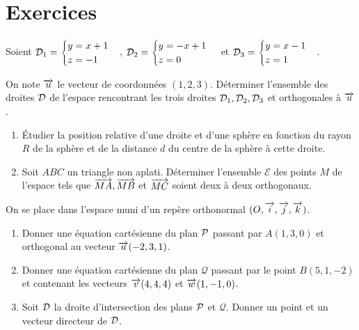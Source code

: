 \section{Exercices}
\begin{exercice}
  Soient \(\Dr_1 = 
  \begin{cases} 
    y = x + 1 \\
    z = -1 
  \end{cases}\), 
  \(\Dr_2 = 
  \begin{cases}
    y = -x + 1 \\
    z = 0 
  \end{cases}\) 
  et \(\Dr_3 = 
  \begin{cases} 
    y = x - 1 \\
    z = 1 
  \end{cases}\). 

  On note \(\vu\) le vecteur de coordonnées \((1, 2, 3)\). Déterminer l'ensemble 
  des droites \(\Dr\) de l'espace rencontrant les trois droites \(\Dr_1, \Dr_2, 
  \Dr_3\) et orthogonales à \(\vu\).
\end{exercice}

\begin{exercice}
  \begin{enumerate}
    \item Étudier la position relative d'une droite et d'une sphère en 
      fonction du rayon \(R\) de la sphère et de la distance \(d\) du centre 
      de la sphère à cette droite.
    \item Soit \(ABC\) un triangle non aplati. Déterminer l'ensemble 
      \(\mathcal{E}\) des points \(M\) de l'espace tels que \(\vect{MA}, 
      \vect{MB}\) et  \(\vect{MC}\) soient deux à deux orthogonaux.
  \end{enumerate}
\end{exercice}

\begin{exercice}
  On se place dans l'espace muni d'un repère orthonormal \((O, \vi, \vj, 
  \vk)\).
  \begin{enumerate}
    \item Donner une équation cartésienne du plan \(\P\) passant par \(A(1, 3, 
      0)\) et orthogonal au vecteur \(\vu(-2, 3, 1)\).
    \item Donner une équation cartésienne du plan \(\mathcal{Q}\) passant par 
      le point \(B(5, 1, -2)\) et contenant les vecteurs \(\vv(4, 4, 4)\) et 
      \(\vw(1, -1, 0)\).
    \item Soit \(\Dr\) la droite d'intersection des plans \(\P\) et 
      \(\mathcal{Q}\). Donner un point et un vecteur directeur de \(\Dr\).
  \end{enumerate}
\end{exercice}

